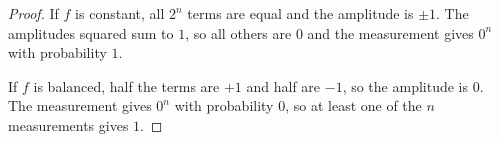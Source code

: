 \begin{exercisebox}
\begin{proof}
    If $f$ is constant, all $2^n$ terms are equal and the amplitude is $\pm 1$. The amplitudes
    squared sum to $1$, so all others are $0$ and the measurement gives $0^n$ with probability $1$.

    If $f$ is balanced, half the terms are $+1$ and half are $-1$, so the amplitude is $0$. The
    measurement gives $0^n$ with probability $0$, so at least one of the $n$ measurements gives $1$.
\end{proof}
\end{exercisebox}
